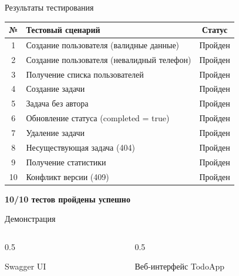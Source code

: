 \documentclass[aspectratio=169, 14pt]{beamer}
\begin{document}
\begin{frame}{Результаты тестирования}

\centering
\footnotesize
\begin{tabular}{|c|l|c|}
\hline
\textbf{№} & \textbf{Тестовый сценарий} & \textbf{Статус} \\
\hline
1 & Создание пользователя (валидные данные) & Пройден \\
2 & Создание пользователя (невалидный телефон) & Пройден \\
3 & Получение списка пользователей & Пройден \\
4 & Создание задачи & Пройден \\
5 & Задача без автора & Пройден \\
6 & Обновление статуса (completed = true) & Пройден \\
7 & Удаление задачи & Пройден \\
8 & Несуществующая задача (404) & Пройден \\
9 & Получение статистики & Пройден \\
10 & Конфликт версии (409) & Пройден \\
\hline
\end{tabular}

\vspace{0.3cm}
\textbf{10/10 тестов пройдены успешно}

\end{frame}

\begin{frame}{Демонстрация}

\begin{columns}[T]
\begin{column}{0.5\textwidth}
\centering
{}

Swagger UI
\end{column}
\begin{column}{0.5\textwidth}
\centering
{}

Веб-интерфейс TodoApp
\end{column}
\end{columns}

\end{frame}
\end{document}
